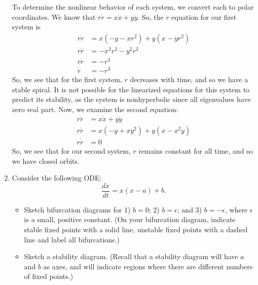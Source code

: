 \documentclass[10pt,letterpaper]{report}
\begin{document}
\begin{enumerate}
To determine the nonlinear behavior of each system, we convert each to polar coordinates. We know that $r\dot r = x\dot x + y \dot y$. So, the $\dot r$ equation for our first system is
\begin{align*}
    r \dot r &= x\left(-y - xr^2\right) + y\left(x - yr^2\right) \\
    r \dot r &= -x^2 r^2 - y^2 r^2 \\
    r \dot r &= -r^4 \\
    \dot r &= -r^3
\end{align*}
So, we see that for the first system, $r$ decreases with time, and so we have a stable spiral. It is not possible for the linearized equations for this system to predict its stability, as the system is nonhyperbolic since all eigenvalues have zero real part. Now, we examine the second equation:
\begin{align*}
    r \dot r &= x \dot x + y \dot y \\
    r \dot r &= x\left(-y + xy^2\right) + y\left(x - x^2 y\right) \\
    r \dot r &= 0
\end{align*}
So, we see that for our second system, $r$ remains constant for all time, and so we have closed orbits.

\item\begin{qbox}
Consider the following ODE:
\[
\frac{dx}{dt} = x(x-a) + b.
\]
\begin{itemize}
    \item Sketch bifurcation diagrams for 1) $b = 0$; 2) $b = \epsilon$; and 3) $b = -\epsilon$, where $\epsilon$ is a small, positive constant. (On your bifurcation diagram, indicate stable fixed points with a solid line, unstable fixed points with a dashed line and label all bifurcations.)
    
    \item Sketch a stability diagram. (Recall that a stability diagram will have $a$ and $b$ as axes, and will indicate regions where there are different numbers of fixed points.)
\end{itemize}
\end{qbox}


\end{enumerate}
\end{document}
